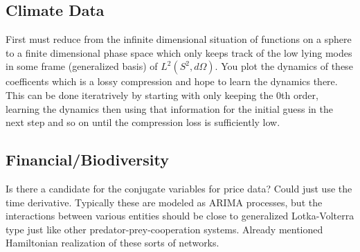 \documentclass[a4paper,landscape]{article}
\theoremstyle{change}
\theoremstyle{nonumberplain}
\numberwithin{equation}{section}
\begin{document}
\subsection{Climate Data}

First must reduce from the infinite dimensional situation of functions on a sphere to a finite dimensional phase space which only keeps track of the low lying modes in some frame (generalized basis) of $L^2 ( S^2 , d \Omega )$. You plot the dynamics of these coefficents which is a lossy compression and hope to learn the dynamics there. This can be done iteratrively by starting with only keeping the 0th order, learning the dynamics then using that information for the initial guess in the next step and so on until the compression loss is sufficiently low.

\subsection{Financial/Biodiversity}

Is there a candidate for the conjugate variables for price data? Could just use the time derivative. Typically these are modeled as ARIMA processes, but the interactions between various entities should be close to generalized Lotka-Volterra type just like other predator-prey-cooperation systems. Already mentioned Hamiltonian realization of these sorts of networks.
\end{document}
